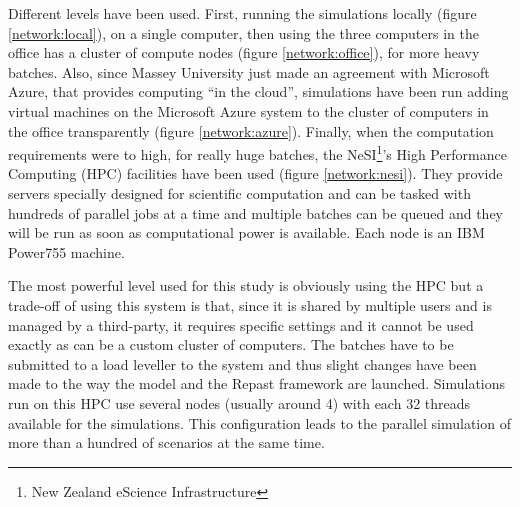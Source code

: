 \documentclass[a4paper,12pt]{report}
\begin{document}
Different levels have been used. First, running the simulations locally (figure \ref{network:local}), on a single computer, then using the three computers in the office has a cluster of compute nodes (figure \ref{network:office}), for more heavy batches. Also, since Massey University just made an agreement with Microsoft Azure, that provides computing “in the cloud”, simulations have been run adding virtual machines on the Microsoft Azure system to the cluster of computers in the office transparently (figure \ref{network:azure}).
Finally, when the computation requirements were to high, for really huge batches, the NeSI\footnote{New Zealand eScience Infrastructure}’s High Performance Computing (HPC) facilities have been used (figure \ref{network:nesi}). They provide servers specially designed for scientific computation and can be tasked with hundreds of parallel jobs at a time and multiple batches can be queued and they will be run as soon as computational power is available. Each node is an IBM Power755 machine.

The most powerful level used for this study is obviously using the HPC but a trade-off of using this system is that, since it is shared by multiple users and is managed by a third-party, it requires specific settings and it cannot be used exactly as can be a custom cluster of computers. The batches have to be submitted to a load leveller to the system and thus slight changes have been made to the way the model and the Repast framework are launched. Simulations run on this HPC use several nodes (usually around 4) with each 32 threads available for the simulations. This configuration leads to the parallel simulation of more than a hundred of scenarios at the same time.
\end{document}

